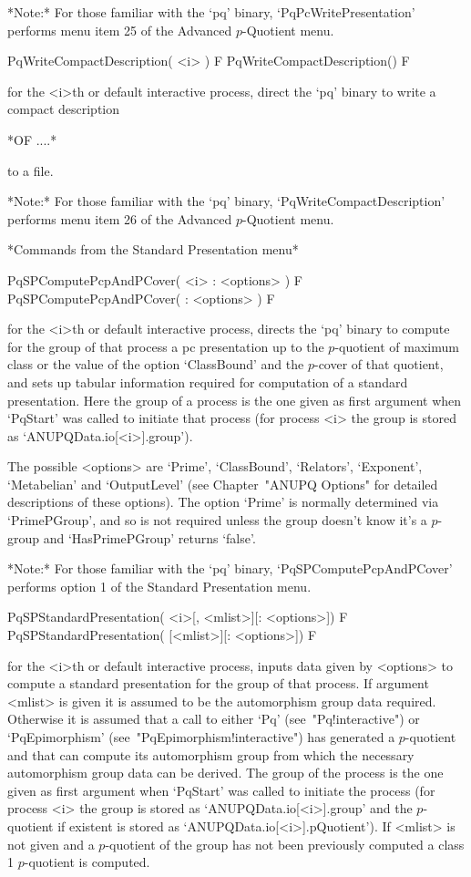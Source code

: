 *Note:* For those familiar with the `pq' binary,  `PqPcWritePresentation'
performs menu item 25 of the Advanced $p$-Quotient menu.

\>PqWriteCompactDescription( <i> ) F
\>PqWriteCompactDescription() F

for the <i>th or default interactive {\ANUPQ} process,  direct  the  `pq'
binary to write a compact description 

*OF ....*

to a file.

*Note:* 
For those familiar  with  the  `pq'  binary,  `PqWriteCompactDescription'
performs menu item 26 of the Advanced $p$-Quotient menu.

*Commands from the Standard Presentation menu*

\>PqSPComputePcpAndPCover( <i> : <options> ) F
\>PqSPComputePcpAndPCover( : <options> ) F

for the <i>th or default interactive {\ANUPQ} process, directs  the  `pq'
binary to compute for the group of that process a pc presentation  up  to
the $p$-quotient of maximum class or the value of the option `ClassBound'
and the $p$-cover of that  quotient,  and  sets  up  tabular  information
required for computation of a standard presentation. Here the group of  a
process is the one given as first argument when `PqStart' was  called  to
initiate  that  process  (for  process  <i>  the  group  is   stored   as
`ANUPQData.io[<i>].group').

The possible <options> are `Prime', `ClassBound', `Relators', `Exponent',
`Metabelian' and `OutputLevel' (see Chapter~"ANUPQ Options" for  detailed
descriptions of these options). The option `Prime' is normally determined
via `PrimePGroup', and so is not required unless the group  doesn't  know
it's a $p$-group and `HasPrimePGroup' returns `false'.

*Note:*
For  those  familiar  with  the  `pq'  binary,  `PqSPComputePcpAndPCover'
performs option 1 of the Standard Presentation menu.

\>PqSPStandardPresentation( <i>[, <mlist>][: <options>]) F
\>PqSPStandardPresentation( [<mlist>][: <options>]) F

for the <i>th or default interactive {\ANUPQ} process, inputs data  given
by <options> to compute a standard presentation for  the  group  of  that
process.  If  argument  <mlist>  is  given  it  is  assumed  to  be   the
automorphism group data required. Otherwise it is assumed that a call  to
either      `Pq'      (see~"Pq!interactive")      or      `PqEpimorphism'
(see~"PqEpimorphism!interactive") has generated a $p$-quotient  and  that
{\GAP} can compute  its  automorphism  group  from  which  the  necessary
automorphism group data can be derived. The group of the process  is  the
one given as first argument when `PqStart' was  called  to  initiate  the
process (for process <i> the group is stored as `ANUPQData.io[<i>].group'
and     the     $p$-quotient     if     existent     is     stored     as
`ANUPQData.io[<i>].pQuotient').  If  <mlist>   is   not   given   and   a
$p$-quotient of the group has not been  previously  computed  a  class  1
$p$-quotient is computed.

